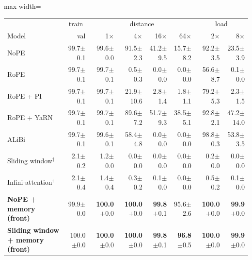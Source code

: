 \begin{table}\centering\small
\setlength{\tabcolsep}{4pt}
\begin{adjustbox}{max width=\linewidth}
\begin{tabular}{lrrrrrrr}
\toprule
 & \multicolumn{1}{c}{train} & \multicolumn{4}{c}{distance} & \multicolumn{2}{c}{load} \\
Model & val & 1$\times$ & 4$\times$ & 16$\times$ & 64$\times$ & 2$\times$ & 8$\times$ \\
\midrule
NoPE & 99.7{\scriptsize$\pm$0.1} & 99.6{\scriptsize$\pm$0.0} & 91.5{\scriptsize$\pm$2.3} & 41.2{\scriptsize$\pm$9.5} & 15.7{\scriptsize$\pm$8.2} & 92.2{\scriptsize$\pm$3.5} & 23.5{\scriptsize$\pm$3.9} \\
RoPE & 99.7{\scriptsize$\pm$0.1} & 99.7{\scriptsize$\pm$0.1} & 0.5{\scriptsize$\pm$0.3} & 0.0{\scriptsize$\pm$0.0} & 0.0{\scriptsize$\pm$0.0} & 56.6{\scriptsize$\pm$8.7} & 0.1{\scriptsize$\pm$0.0} \\
RoPE + PI & 99.7{\scriptsize$\pm$0.1} & 99.7{\scriptsize$\pm$0.1} & 21.9{\scriptsize$\pm$10.6} & 2.8{\scriptsize$\pm$1.4} & 1.8{\scriptsize$\pm$1.1} & 79.2{\scriptsize$\pm$5.3} & 2.3{\scriptsize$\pm$1.5} \\
RoPE + YaRN & 99.7{\scriptsize$\pm$0.1} & 99.7{\scriptsize$\pm$0.1} & 89.6{\scriptsize$\pm$7.2} & 51.7{\scriptsize$\pm$9.3} & 38.5{\scriptsize$\pm$5.1} & 92.8{\scriptsize$\pm$2.1} & 47.2{\scriptsize$\pm$14.0} \\
ALiBi & 99.7{\scriptsize$\pm$0.1} & 99.6{\scriptsize$\pm$0.1} & 58.4{\scriptsize$\pm$4.8} & 0.0{\scriptsize$\pm$0.0} & 0.0{\scriptsize$\pm$0.0} & 98.8{\scriptsize$\pm$0.3} & 53.8{\scriptsize$\pm$3.5} \\
Sliding window$^\dagger$ & 2.1{\scriptsize$\pm$0.2} & 1.2{\scriptsize$\pm$0.0} & 0.0{\scriptsize$\pm$0.0} & 0.0{\scriptsize$\pm$0.0} & 0.0{\scriptsize$\pm$0.0} & 0.2{\scriptsize$\pm$0.0} & 0.0{\scriptsize$\pm$0.0} \\
Infini-attention$^\dagger$ & 2.1{\scriptsize$\pm$0.4} & 1.4{\scriptsize$\pm$0.4} & 0.3{\scriptsize$\pm$0.2} & 0.1{\scriptsize$\pm$0.0} & 0.0{\scriptsize$\pm$0.0} & 0.5{\scriptsize$\pm$0.2} & 0.1{\scriptsize$\pm$0.0} \\
\textbf{NoPE + memory (front)} & 99.9{\scriptsize$\pm$0.0} & \textbf{100.0}{\scriptsize$\pm$0.0} & \textbf{100.0}{\scriptsize$\pm$0.0} & \textbf{99.8}{\scriptsize$\pm$0.1} & 95.6{\scriptsize$\pm$2.6} & \textbf{100.0}{\scriptsize$\pm$0.0} & \textbf{99.9}{\scriptsize$\pm$0.0} \\
\textbf{Sliding window + memory (front)} & 100.0{\scriptsize$\pm$0.0} & \textbf{100.0}{\scriptsize$\pm$0.0} & \textbf{100.0}{\scriptsize$\pm$0.0} & \textbf{99.8}{\scriptsize$\pm$0.1} & \textbf{96.8}{\scriptsize$\pm$0.5} & \textbf{100.0}{\scriptsize$\pm$0.0} & \textbf{99.9}{\scriptsize$\pm$0.0} \\

\end{tabular}
\end{adjustbox}
\end{table}
